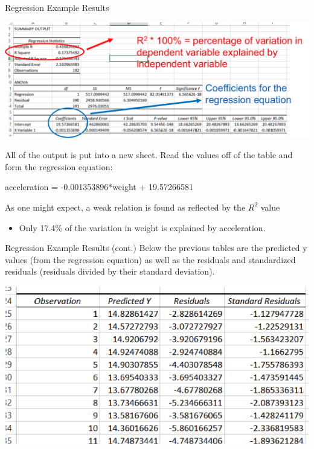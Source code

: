 \documentclass[xcolor=svgnames]{beamer}
\begin{document}
\begin{frame}[label=current]{Regression Example Results}
\begin{center}\includegraphics[width=.8\textwidth]{RegressionResults}
\end{center}
All of the output is put into a new sheet.  Read the values off of the table and form the regression equation: 
\begin{center}
acceleration = -0.001353896*weight + 19.57266581
\end{center}
As one might expect, a weak relation is found as reflected by the  $R^2$ value 
\begin{itemize}
\item Only 17.4\% of the variation in weight is explained by acceleration. 
\end{itemize}

\end{frame}

\begin{frame}[label=current]{Regression Example Results (cont.)}
Below the previous tables are the predicted y values (from the regression equation) as well as the residuals and standardized residuals (residuals divided by their standard deviation). 
\begin{center}
\includegraphics[width=.75\textwidth]{RER1}
\end{center}
\end{frame}
\end{document}

